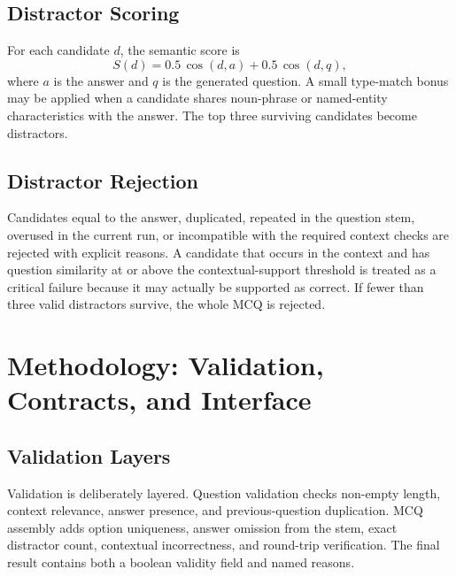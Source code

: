 \documentclass[12pt,a4paper]{report}
\begin{document}
\section{Distractor Scoring}
For each candidate $d$, the semantic score is
\[
S(d)=0.5\,\operatorname{cos}(d,a)+0.5\,\operatorname{cos}(d,q),
\]
where $a$ is the answer and $q$ is the generated question. A small type-match bonus may be applied when a candidate shares noun-phrase or named-entity characteristics with the answer. The top three surviving candidates become distractors.

\section{Distractor Rejection}
Candidates equal to the answer, duplicated, repeated in the question stem, overused in the current run, or incompatible with the required context checks are rejected with explicit reasons. A candidate that occurs in the context and has question similarity at or above the contextual-support threshold is treated as a critical failure because it may actually be supported as correct. If fewer than three valid distractors survive, the whole MCQ is rejected.

\clearpage
\chapter{Methodology: Validation, Contracts, and Interface}
\section{Validation Layers}
Validation is deliberately layered. Question validation checks non-empty length, context relevance, answer presence, and previous-question duplication. MCQ assembly adds option uniqueness, answer omission from the stem, exact distractor count, contextual incorrectness, and round-trip verification. The final result contains both a boolean validity field and named reasons.
\end{document}

